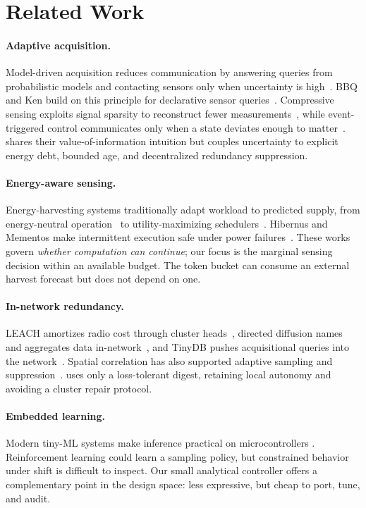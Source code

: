 \section{Related Work}
\label{sec:related}

\paragraph{Adaptive acquisition.}
Model-driven acquisition reduces communication by answering queries from
probabilistic models and contacting sensors only when uncertainty is
high~\cite{deshpande2004model}.  BBQ and Ken build on this principle for
declarative sensor queries~\cite{deshpande2005model}.  Compressive sensing
exploits signal sparsity to reconstruct fewer measurements~\cite{candes2006robust,jain2004duality}, while event-triggered control communicates only when a state
deviates enough to matter~\cite{astrom2008event}.  \system shares their
value-of-information intuition but couples uncertainty to explicit energy debt,
bounded age, and decentralized redundancy suppression.

\paragraph{Energy-aware sensing.}
Energy-harvesting systems traditionally adapt workload to predicted supply,
from energy-neutral operation~\cite{kansal2007power} to utility-maximizing
schedulers~\cite{raghunathan2006energyscavenging}.  Hibernus and Mementos make
intermittent execution safe under power failures~\cite{balsamo2015hibernus,ransford2011mementos}.  These works govern \emph{whether computation can continue}; our
focus is the marginal sensing decision within an available budget.  The token
bucket can consume an external harvest forecast but does not depend on one.

\paragraph{In-network redundancy.}
LEACH amortizes radio cost through cluster heads~\cite{heinzelman2000energy},
directed diffusion names and aggregates data in-network~\cite{intanagonwiwat2000directed}, and TinyDB pushes acquisitional queries into the network~\cite{madden2004tinydb}.  Spatial correlation has also supported adaptive
sampling and suppression~\cite{guestrin2005distributed}.  \system uses only a
loss-tolerant digest, retaining local autonomy and avoiding a cluster repair
protocol.

\paragraph{Embedded learning.}
Modern tiny-ML systems make inference practical on microcontrollers
\cite{banbury2021benchmarking,lin2020mcunet}.  Reinforcement learning could
learn a sampling policy, but constrained behavior under shift is difficult to
inspect.  Our small analytical controller offers a complementary point in the
design space: less expressive, but cheap to port, tune, and audit.
